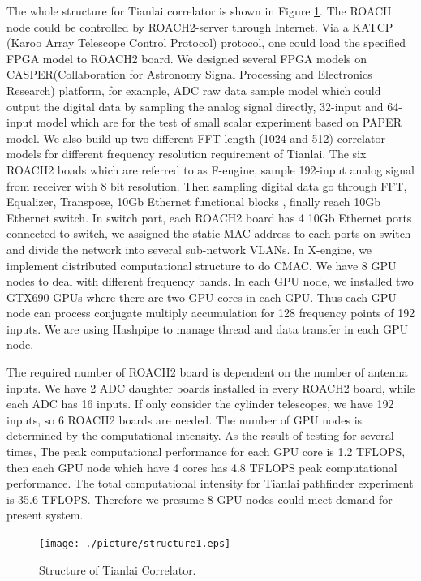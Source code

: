 \documentclass{ws-jai}
\begin{document}
	The whole structure for Tianlai correlator is shown in Figure \ref{fig:structure}. The ROACH node could be controlled by ROACH2-server through Internet. Via a KATCP (Karoo Array Telescope Control Protocol) protocol, one could load the specified FPGA model to ROACH2 board.  We designed several FPGA models on CASPER(Collaboration for Astronomy Signal Processing and Electronics Research)  platform, for example, ADC raw data sample model which could output the digital data by sampling the analog signal directly, 32-input and 64-input model which are for the test of small scalar experiment based on PAPER model.  We also build up two different FFT length (1024 and 512) correlator models for different frequency resolution requirement of Tianlai. The six ROACH2 boads which are referred to as F-engine, sample 192-input analog signal from receiver with 8 bit resolution.  Then sampling digital data go through FFT, Equalizer, Transpose, 10Gb Ethernet functional blocks , finally reach 10Gb Ethernet switch. In switch part, each ROACH2 board has 4 10Gb Ethernet ports connected to switch, we assigned the static MAC address to each ports on switch and divide the network into several sub-network VLANs.  In X-engine, we implement distributed computational structure to do CMAC. We  have 8 GPU nodes to deal with different frequency bands. In each GPU node, we installed two GTX690 GPUs where there are two GPU cores in each GPU. Thus each GPU node can process conjugate multiply accumulation for 128  frequency points of 192 inputs.  We are using Hashpipe to manage thread and data transfer in each GPU node. 
		
	The required number of ROACH2 board is dependent on the number of antenna inputs. We have 2 ADC daughter boards installed in every ROACH2 board, while each ADC has 16 inputs.  If only consider the cylinder telescopes, we have 192 inputs, so 6 ROACH2 boards are needed.  The number of GPU nodes is determined by the computational intensity. As the result of testing for several times, The peak computational performance for each GPU core is 1.2 TFLOPS,  then each GPU node which have 4 cores has 4.8 TFLOPS peak computational performance. The total computational intensity for Tianlai pathfinder experiment is 35.6 TFLOPS. Therefore we presume  8 GPU nodes  could meet demand for present system.
\begin{figure}[t]
 \centering
 \texttt{[image: ./picture/structure1.eps]}
\caption{Structure of Tianlai Correlator.\label{fig:structure}}
\end{figure}
\\
\end{document}
